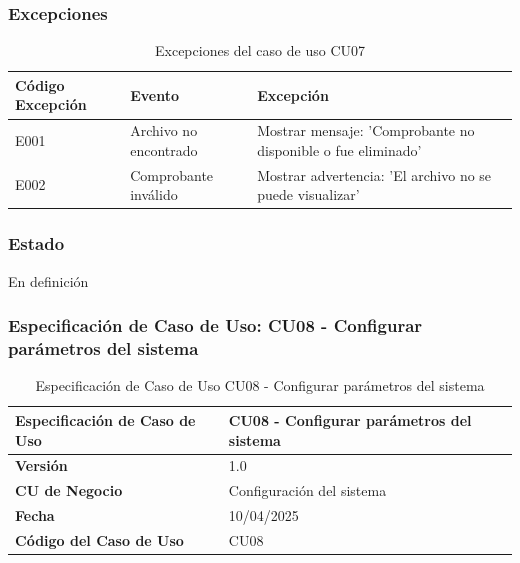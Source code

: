 \subsubsection*{Excepciones}
\begin{table}[h]
	\centering
	\caption{Excepciones del caso de uso CU07}
	\begin{tabular}{|p{3cm}|p{5cm}|p{5cm}|}
		\hline
		\textbf{Código Excepción} & \textbf{Evento}       & \textbf{Excepción}                                           \\ \hline
		E001                      & Archivo no encontrado & Mostrar mensaje: 'Comprobante no disponible o fue eliminado' \\ \hline
		E002                      & Comprobante inválido  & Mostrar advertencia: 'El archivo no se puede visualizar'     \\ \hline
	\end{tabular}
\end{table}

\subsubsection*{Estado}
En definición

\subsubsection*{Especificación de Caso de Uso: CU08 - Configurar parámetros del sistema}

\begin{table}[h]
	\centering
	\caption{Especificación de Caso de Uso CU08 - Configurar parámetros del sistema}
	\begin{tabular}{|p{5cm}|p{9cm}|}
		\hline
		\textbf{Especificación de Caso de Uso} & CU08 - Configurar parámetros del sistema \\ \hline
		\textbf{Versión}                       & 1.0                                      \\ \hline
		\textbf{CU de Negocio}                 & Configuración del sistema                \\ \hline
		\textbf{Fecha}                         & 10/04/2025                               \\ \hline
		\textbf{Código del Caso de Uso}        & CU08                                     \\ \hline
	\end{tabular}
\end{table}

